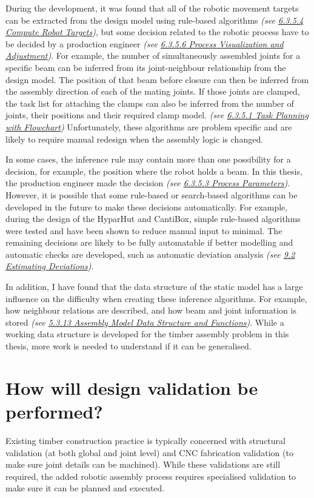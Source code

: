 \documentclass[11pt]{book}
\begin{document}
During the development, it was found that all of the robotic movement targets can be extracted from the design model using rule-based algorithms \textit{(see \uline{6.3.5.4 Compute Robot Targets})}, but some decision related to the robotic process have to be decided by a production engineer \textit{(see \uline{6.3.5.6 Process Visualization and Adjustment})}. For example, the number of simultaneously assembled joints for a specific beam can be inferred from its joint-neighbour relationship from the design model. The position of that beam before closure can then be inferred from the assembly direction of each of the mating joints. If those joints are clamped, the task list for attaching the clamps can also be inferred from the number of joints, their positions and their required clamp model. \textit{(see \uline{6.3.5.1 Task Planning with Flowchart}) }Unfortunately, these algorithms are problem specific and are likely to require manual redesign when the assembly logic is changed. 

In some cases, the inference rule may contain more than one possibility for a decision, for example, the position where the robot holds a beam. In this thesis, the production engineer made the decision \textit{(see \uline{6.3.5.3 Process Parameters})}. However, it is possible that some rule-based or search-based algorithms can be developed in the future to make these decisions automatically. For example, during the design of the HyparHut and CantiBox, simple rule-based algorithms were tested and have been shown to reduce manual input to minimal. The remaining decisions are likely to be fully automatable if better modelling and automatic checks are developed, such as automatic deviation analysis\textit{ (see \uline{9.2 Estimating Deviations})}.

In addition, I have found that the data structure of the static model has a large influence on the difficulty when creating these inference algorithms. For example, how neighbour relations are described, and how beam and joint information is stored \textit{(see \uline{5.3.13 Assembly Model Data Structure and Functions})}. While a working data structure is developed for the timber assembly problem in this thesis, more work is needed to understand if it can be generalised. 

\section{How will design validation be performed?}

Existing timber construction practice is typically concerned with structural validation (at both global and joint level) and CNC fabrication validation (to make sure joint details can be machined). While these validations are still required, the added robotic assembly process requires specialised validation to make sure it can be planned and executed. 
\end{document}
